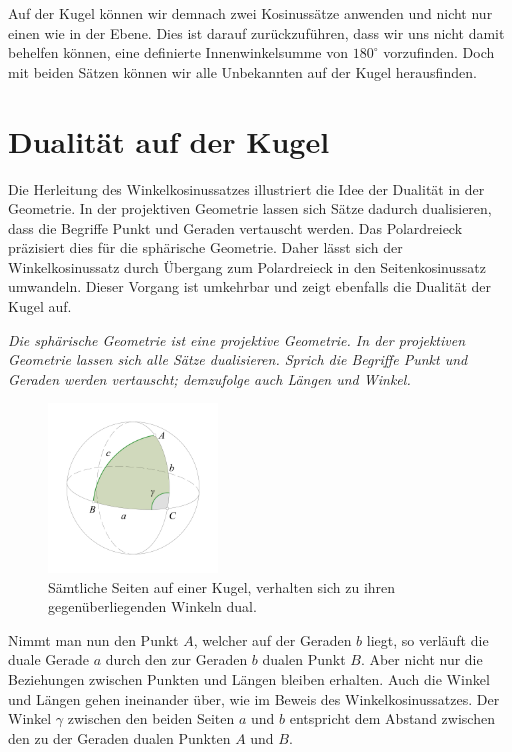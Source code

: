 \begin{refsection}
Auf der Kugel können wir demnach zwei Kosinussätze anwenden und nicht nur einen wie in der Ebene. Dies ist darauf zurückzuführen, dass wir uns nicht damit behelfen können, eine definierte Innenwinkelsumme von $180^{\circ}$ vorzufinden. Doch mit beiden Sätzen können wir alle Unbekannten auf der Kugel herausfinden.



\section{Dualität auf der Kugel}
Die Herleitung des Winkelkosinussatzes illustriert die Idee der Dualität in der Geometrie. In der projektiven Geometrie lassen sich Sätze dadurch dualisieren, dass die Begriffe Punkt und Geraden vertauscht werden. Das Polardreieck präzisiert dies für die sphärische Geometrie.
Daher lässt sich der Winkelkosinussatz durch Übergang zum Polardreieck in den Seitenkosinussatz umwandeln. Dieser Vorgang ist umkehrbar und zeigt ebenfalls die Dualität der Kugel auf.

\begin{satz}\textit{Die sphärische Geometrie ist eine projektive Geometrie. In der projektiven Geometrie lassen sich alle Sätze dualisieren. Sprich die Begriffe Punkt und Geraden werden vertauscht; demzufolge auch Längen und Winkel.}
\label{skript:kugel:satz:Dualitaet}
\end{satz}

\begin{figure}[htbp]
\centering
\includegraphics[width=0.4\textwidth]{kugel/Dualitaet.jpg}
\caption{Sämtliche Seiten auf einer Kugel, verhalten sich zu ihren gegenüberliegenden Winkeln dual.}
\end{figure}

Nimmt man nun den Punkt $A$, welcher auf der Geraden $b$ liegt, so verläuft die duale Gerade $a$ durch den zur Geraden $b$ dualen Punkt $B$. 
Aber nicht nur die Beziehungen zwischen Punkten und Längen bleiben erhalten. Auch die Winkel und Längen gehen ineinander über, wie im Beweis des Winkelkosinussatzes.
Der Winkel $\gamma$ zwischen den beiden Seiten $a$ und $b$ entspricht dem Abstand zwischen den zu der Geraden dualen Punkten $A$ und $B$.




\end{refsection}
